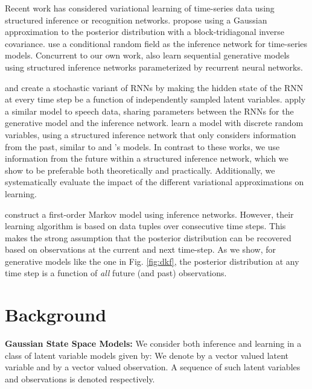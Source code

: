 \documentclass[letterpaper]{article}
\theoremstyle{plain}
\begin{document}
Recent work has considered variational learning of time-series
data using structured inference or recognition networks.
\citeauthor{archer2015black} propose using a
Gaussian approximation to the posterior distribution with a block-tridiagonal inverse covariance. 
\citeauthor{johnson2016structured} use a conditional random field as the inference network for time-series models. 
Concurrent to our own work, \citeauthor{fraccaro2016sequential} also learn sequential generative models 
using structured inference networks parameterized by recurrent neural networks.

\citeauthor{bayer2014learning} and \citeauthor{fabius2014variational} create a stochastic variant of RNNs 
by making the hidden state of the RNN at every time step be a function
of independently sampled latent variables. \citeauthor{chung2015recurrent}
apply a similar model to speech data, sharing parameters between the
RNNs for the generative model and the inference network.
\citeauthor{gan2015deep} learn a 
model with discrete random variables, using a structured inference network that only considers information from the 
past, similar to \citeauthor{chung2015recurrent} and \citeauthor{gregor2015draw}'s models. 
In contrast to these works, we use information from the future within a
structured inference network, which we show to be preferable both
theoretically and practically. Additionally, we systematically
evaluate the impact of the different variational approximations on
learning. 

\citeauthor{watter2015embed} construct a first-order Markov model using inference networks. However, their learning
algorithm is based on data tuples over consecutive time steps. This makes the strong assumption
that the posterior distribution can be recovered based on observations
at the current and next time-step.
As we show, for generative models like the one in Fig. \ref{fig:dkf}, the 
posterior distribution at any time step is a function of \emph{all}
future (and past) observations. 
 \section{Background}\label{sec:back}

\textbf{Gaussian State Space Models:}
We consider both inference and learning in a class of latent variable models given by:
We denote by  a vector valued latent variable and by  a vector valued observation. 
A sequence of such latent variables and observations is denoted  respectively.
\end{document}
